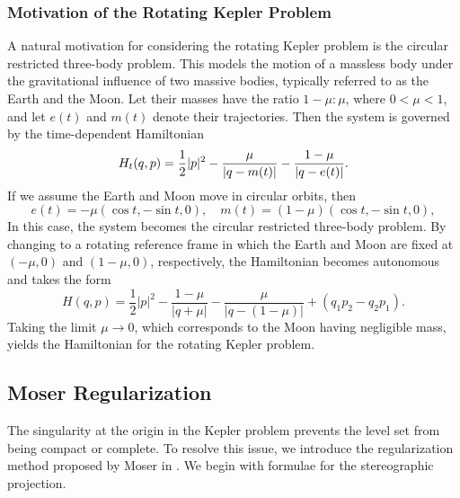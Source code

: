 \documentclass{amsart}
\begin{document}
	\subsubsection*{Motivation of the Rotating Kepler Problem}
	A natural motivation for considering the rotating Kepler problem is the circular restricted three-body problem.
	This models the motion of a massless body under the gravitational influence of two massive bodies, typically referred to as the Earth and the Moon.
	Let their masses have the ratio $1-\mu : \mu$, where $0 < \mu < 1$, and let $e(t)$ and $m(t)$ denote their trajectories. Then the system is governed by the time-dependent Hamiltonian
	$$
	H_t(q,p) = \frac{1}{2}|p|^2 - \frac{\mu}{|q-m(t)|}-\frac{1-\mu}{|q-e(t)|}.\\
	$$
	If we assume the Earth and Moon move in circular orbits, then
	$$
	e(t)=-\mu(\cos t,-\sin t,0),\quad m(t) = (1-\mu)(\cos t, -\sin t, 0),
	$$
	In this case, the system becomes the circular restricted three-body problem.
	By changing to a rotating reference frame in which the Earth and Moon are fixed at $(-\mu, 0)$ and $(1 - \mu, 0)$, respectively, the Hamiltonian becomes autonomous and takes the form
	$$
	H(q,p) = \frac{1}{2}|p|^2 -\frac{1-\mu}{|q+\mu|}-\frac{\mu}{|q-(1-\mu)|}+ (q_1 p_2 - q_2 p_1).
	$$
	Taking the limit $\mu \to 0$, which corresponds to the Moon having negligible mass, yields the Hamiltonian for the rotating Kepler problem.


\subsection{Moser Regularization}\label{Subsection - Moser regularization}

The singularity at the origin in the Kepler problem prevents the level set from being compact or complete.
To resolve this issue, we introduce the regularization method proposed by Moser in \cite{Moser_70}.
We begin with formulae for the stereographic projection.
\end{document}
